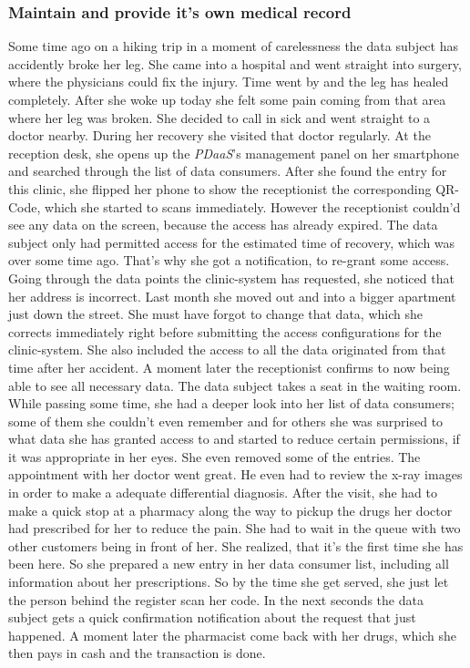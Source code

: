 \documentclass[12pt,english,a4paper,titlepage,cleardoublepage=empty,dottedtoc]{report}
\begin{document}
\subsubsection{Maintain and provide it's own medical
record}\label{maintain-and-provide-its-own-medical-record}

Some time ago on a hiking trip in a moment of carelessness the data
subject has accidently broke her leg. She came into a hospital and went
straight into surgery, where the physicians could fix the injury. Time
went by and the leg has healed completely. After she woke up today she
felt some pain coming from that area where her leg was broken. She
decided to call in sick and went straight to a doctor nearby. During her
recovery she visited that doctor regularly. At the reception desk, she
opens up the \emph{PDaaS}'s management panel on her smartphone and
searched through the list of data consumers. After she found the entry
for this clinic, she flipped her phone to show the receptionist the
corresponding QR-Code, which she started to scans immediately. However
the receptionist couldn'd see any data on the screen, because the access
has already expired. The data subject only had permitted access for the
estimated time of recovery, which was over some time ago. That's why she
got a notification, to re-grant some access. Going through the data
points the clinic-system has requested, she noticed that her address is
incorrect. Last month she moved out and into a bigger apartment just
down the street. She must have forgot to change that data, which she
corrects immediately right before submitting the access configurations
for the clinic-system. She also included the access to all the data
originated from that time after her accident. A moment later the
receptionist confirms to now being able to see all necessary data. The
data subject takes a seat in the waiting room. While passing some time,
she had a deeper look into her list of data consumers; some of them she
couldn't even remember and for others she was surprised to what data she
has granted access to and started to reduce certain permissions, if it
was appropriate in her eyes. She even removed some of the entries. The
appointment with her doctor went great. He even had to review the x-ray
images in order to make a adequate differential diagnosis. After the
visit, she had to make a quick stop at a pharmacy along the way to
pickup the drugs her doctor had prescribed for her to reduce the pain.
She had to wait in the queue with two other customers being in front of
her. She realized, that it's the first time she has been here. So she
prepared a new entry in her data consumer list, including all
information about her prescriptions. So by the time she get served, she
just let the person behind the register scan her code. In the next
seconds the data subject gets a quick confirmation notification about
the request that just happened. A moment later the pharmacist come back
with her drugs, which she then pays in cash and the transaction is done.
\end{document}

